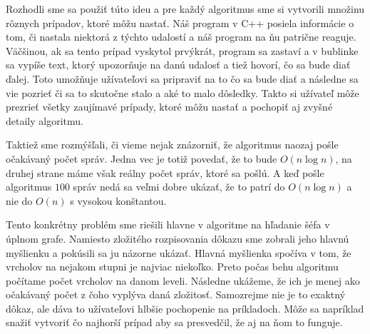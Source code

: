 Rozhodli sme sa použiť túto ideu a pre každý algoritmus sme si vytvorili množinu rôznych prípadov,
ktoré môžu nastať. Náš program v C++ posiela informácie o tom, či nastala niektorá z týchto udalostí
a náš program na ňu patrične reaguje. Väčšinou, ak sa tento prípad vyskytol prvýkrát, program sa
zastaví a v bublinke sa vypíše text, ktorý upozorňuje na danú udalosť a tiež hovorí, čo sa bude
diať ďalej. Toto umožňuje užívateľovi sa pripraviť na to čo sa bude diať a následne sa vie pozrieť
či sa to skutočne stalo a aké to malo dôsledky. Takto si užívateľ môže prezrieť všetky zaujímavé
prípady, ktoré môžu nastať a pochopiť aj zvyšné detaily algoritmu.

Taktiež sme rozmýšľali, či vieme nejak znázorniť, že algoritmus naozaj pošle očakávaný počet správ.
Jedna vec je totiž povedať, že to bude $O(n\log n)$, na druhej strane máme však reálny počet správ,
ktoré sa pošlú. A keď pošle algoritmus $100$ správ nedá sa veľmi dobre ukázať, že to patrí do $O(n
\log n)$ a nie do $O(n)$ s vysokou konštantou.

Tento konkrétny problém sme riešili hlavne v algoritme na hľadanie šéfa v úplnom grafe. Namiesto
zložitého rozpisovania dôkazu sme zobrali jeho hlavnú myšlienku a pokúsili sa ju názorne ukázať.
Hlavná myšlienka spočíva v tom, že vrcholov na nejakom stupni je najviac niekoľko. Preto počas behu
algoritmu počítame počet vrcholov na danom leveli. Následne ukážeme, že ich je menej ako očakávaný
počet z čoho vyplýva daná zložitosť. Samozrejme nie je to exaktný dôkaz, ale dáva to užívateľovi
hlbšie pochopenie na príkladoch. Môže sa napríklad snažiť vytvoriť čo najhorší prípad aby sa
presvedčil, že aj na ňom to funguje.
